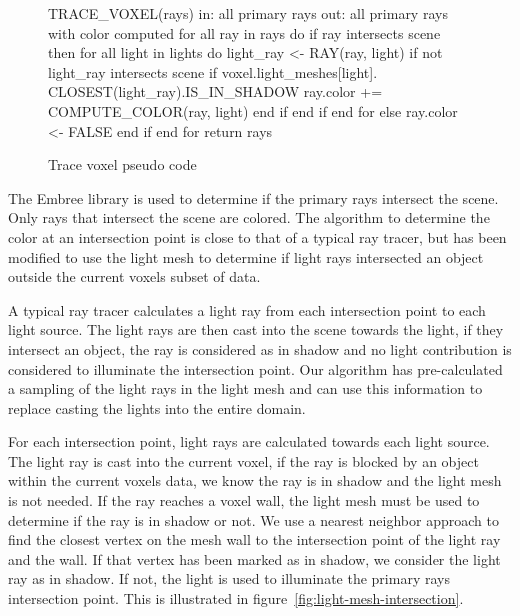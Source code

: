 \begin{figure}[!htb]
\begin{algorithm}
TRACE_VOXEL(rays)
  in: all primary rays
  out: all primary rays with color computed
  for all ray in rays do
    if ray intersects scene then
      for all light in lights do
        light_ray <- RAY(ray, light)
        if not light_ray intersects scene
          if voxel.light_meshes[light].
            CLOSEST(light_ray).IS_IN_SHADOW
              ray.color += COMPUTE_COLOR(ray, light)  
          end if           
        end if      
      end for
    else
      ray.color <- FALSE
    end if
  end for
return rays
\end{algorithm}
\caption{Trace voxel pseudo code}
\label{fig:trace-voxel}
\end{figure}

The Embree library is used to determine if the primary rays intersect the scene.
Only rays that intersect the scene are colored.  The algorithm to determine the
color at an intersection point is close to that of a typical ray tracer, but has
been modified to use the light mesh to determine if light rays intersected an 
object outside the current voxels subset of data.  

A typical ray tracer calculates a light ray from each intersection point to each 
light source.  The light rays are then cast into the scene towards the light, if
they intersect an object, the ray is considered as in shadow and no light 
contribution is considered to illuminate the intersection point.  Our algorithm
has pre-calculated a sampling of the light rays in the light mesh and can use 
this information to replace casting the lights into the entire domain.

For each intersection point, light rays are calculated towards each light 
source.  The light ray is cast into the current voxel, if the ray is blocked by
an object within the current voxels data, we know the ray is in shadow and the
light mesh is not needed.  If the ray reaches a voxel wall, the light mesh must
be used to determine if the ray is in shadow or not.  We use a nearest neighbor 
approach to find the closest vertex on the mesh wall to the intersection point 
of the light ray and the wall.  If that vertex has been marked as in shadow, we
consider the light ray as in shadow.  If not, the light is used to illuminate 
the primary rays intersection point.  This is illustrated in 
figure~\ref{fig:light-mesh-intersection}.  

